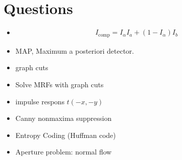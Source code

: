 \newpage
\chapter{Questions}
\begin{itemize}
	\item 
	\begin{gather*}
		I_{\text{comp}}=I_{\alpha}I_{a}+\left( 1-I_{\alpha} \right)I_b
	\end{gather*}
	\item MAP, Maximum a posteriori detector.
	\item graph cuts
	\item Solve MRFs with graph cuts
	\item impulse respons $t(-x,-y)$
	\item Canny nonmaxima suppression
	\item Entropy Coding (Huffman code)
	\item Aperture problem: normal flow
\end{itemize}
